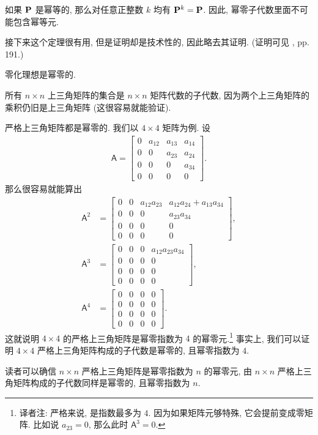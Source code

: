 \documentclass[lang=cn,zihao=-4,twoside,fontset=none]{textbook}
\def\eq#1{\[\begin{aligned}{}#1\end{aligned}\]}
\newcommand{\sfA}{{\mathsf{A}}}
\begin{document}
如果 ${\mathbf P}$ 是幂等的, 那么对任意正整数 $k$ 均有 ${\mathbf P}^k={\mathbf P}$. 因此, 幂零子代数里面不可能包含幂等元. 

接下来这个定理很有用, 但是证明却是技术性的, 因此略去其证明. (证明可见 \cite{Bly90}, pp. 191.)

\begin{theorem}
    \label{thm:3.5.3}%
    零化理想是幂零的. 
\end{theorem}

\begin{exam}
    \label{eg:3.5.4}%
    所有 $n\times n$ 上三角矩阵的集合是 $n\times n$ 矩阵代数的子代数, 因为两个上三角矩阵的乘积仍旧是上三角矩阵 (这很容易就能验证).

    严格上三角矩阵都是幂零的. 我们以 $4\times4$ 矩阵为例. 设  
    \eq{
        \sfA = \begin{bmatrix}
            0 & a_{12} & a_{13} & a_{14} \\
            0&0 & a_{23} & a_{24} \\
            0 & 0 & 0 & a_{34} \\
            0 & 0 & 0 & 0
        \end{bmatrix}.
    }
    那么很容易就能算出 
    \eq{
        \sfA^2&=\begin{bmatrix}
            0 & 0 & a_{12}a_{23} & a_{12}a_{24}+ a_{13}a_{34}\\
            0 &0 & 0 & a_{23}a_{34}\\
            0 & 0 & 0 & 0 \\
            0 & 0 & 0 & 0 
        \end{bmatrix},\\
        \sfA^3&=\begin{bmatrix}
            0 & 0 & 0 & a_{12}a_{23}a_{34} \\
            0 & 0 & 0 & 0 \\
            0 & 0 & 0 & 0 \\
            0 & 0 & 0 & 0
        \end{bmatrix}, \\ 
        \sfA^4&=\begin{bmatrix}
            0 & 0 & 0 & 0 \\
            0 & 0 & 0 & 0 \\
            0 & 0 & 0 & 0 \\
            0 & 0 & 0 & 0
        \end{bmatrix}.
    }
    这就说明 $4\times 4$ 的严格上三角矩阵是幂零指数为 $4$ 的幂零元.\footnote{译者注: 严格来说, 是指数最多为 $4$. 因为如果矩阵元够特殊, 它会提前变成零矩阵. 比如说 $a_{23}=0$, 那么此时 $\sfA^3=0$.} 事实上, 我们可以证明 $4\times 4$ 严格上三角矩阵构成的子代数是幂零的, 且幂零指数为 $4$.

    读者可以确信 $n\times n$ 严格上三角矩阵是幂零指数为 $n$ 的幂零元, 由 $n\times n$ 严格上三角矩阵构成的子代数同样是幂零的, 且幂零指数为 $n$. 
\end{exam}
\end{document}

